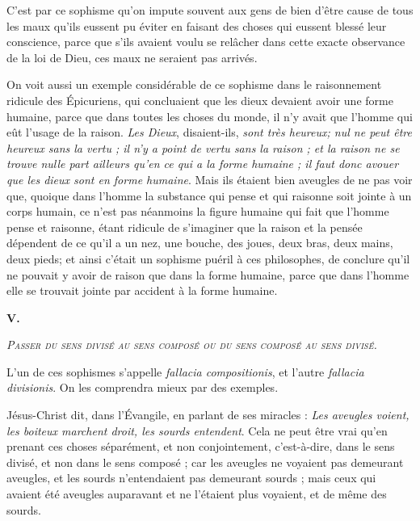 C'est par ce sophisme qu'on impute souvent aux gens de bien d'être cause de tous les maux qu'ils eussent pu éviter en faisant des choses qui eussent blessé leur conscience, parce que s'ils avaient voulu se relâcher dans cette exacte observance de la loi de Dieu, ces maux ne seraient pas arrivés.

On voit aussi un exemple considérable de ce sophisme dans le raisonnement ridicule des Épicuriens, qui concluaient que les dieux devaient avoir une forme humaine, parce que dans toutes les choses du monde, il n'y avait que l'homme qui eût l'usage de la raison. \emph{Les Dieux}, disaient-ils, \emph{sont très heureux; nul ne peut être heureux sans la vertu ; il n'y a point de vertu sans la raison ; et la raison ne se trouve nulle part ailleurs qu'en ce qui a la forme humaine ; il faut donc avouer que les dieux sont en forme humaine}. Mais ils étaient bien aveugles de ne pas voir que, quoique dans l'homme la substance qui pense et qui raisonne soit jointe à un corps humain, ce n'est pas néanmoins la figure humaine qui fait que l'homme pense et raisonne, étant ridicule de s'imaginer que la raison et la pensée dépendent de ce qu'il a un nez, une bouche, des joues, deux bras, deux mains, deux pieds; et ainsi c'était un sophisme puéril à ces philosophes, de conclure qu'il ne pouvait y avoir de raison que dans la forme humaine, parce que dans l'homme elle se trouvait jointe par accident à la forme humaine.

\newpage

\begin{center}{\bfseries\large V.}\end{center}
\begin{center}\emph{\scshape Passer du sens divisé au sens composé ou du sens composé au sens divisé.}\end{center}

L'un de ces sophismes s'appelle \emph{fallacia compositionis}, et l'autre \emph{fallacia divisionis}. On les comprendra mieux par des exemples.

Jésus-Christ dit, dans l'Évangile, en parlant de ses miracles : \emph{Les aveugles voient, les boiteux marchent droit, les sourds entendent}. Cela ne peut être vrai qu'en prenant ces choses séparément, et non conjointement, c'est-à-dire, dans le sens divisé, et non dans le sens composé ; car les aveugles ne voyaient pas demeurant aveugles, et les sourds n'entendaient pas demeurant sourds ; mais ceux qui avaient été aveugles auparavant et ne l'étaient plus voyaient, et de même des sourds.

